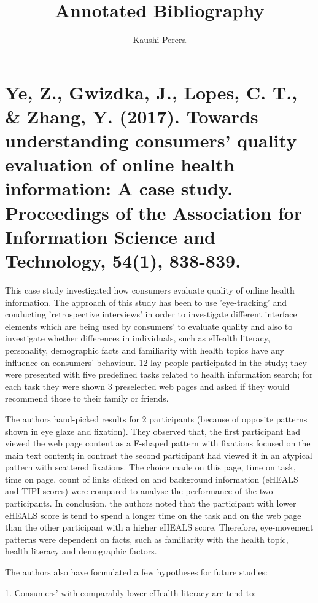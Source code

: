 \documentclass[]{article}
\title{Annotated Bibliography}
\author{Kaushi Perera}
\begin{document}
\maketitle


\section{Ye, Z., Gwizdka, J., Lopes, C. T., \& Zhang, Y. (2017). Towards understanding consumers' quality evaluation of online health information: A case study. Proceedings of the Association for Information Science and Technology, 54(1), 838-839.}

This case study investigated how consumers evaluate quality of online health information. The approach of this study has been to use 'eye-tracking' and conducting 'retrospective interviews' in order to investigate different interface elements which are being used by consumers' to evaluate quality and also to investigate whether differences in individuals, such as eHealth literacy, personality, demographic facts and familiarity with health topics have any influence on consumers' behaviour. 12 lay people participated in the study; they were presented with five predefined tasks related to health information search; for each task they were shown 3 preselected web pages and asked if they would recommend those to their family or friends. 

The authors hand-picked results for 2 participants (because of opposite patterns shown in eye glaze and fixation). They observed that, the first participant had viewed the web page content as a F-shaped pattern with fixations focused on the main text content; in contrast the second participant had viewed it in an atypical pattern with scattered fixations. The choice made on this page, time on task, time on page, count of links clicked on and background information (eHEALS and TIPI scores) were compared to analyse the performance of the two participants. In conclusion, the authors noted that the participant with lower eHEALS score is tend to spend a longer time on the task and on the web page than the other participant with a higher eHEALS score. Therefore, eye-movement patterns were dependent on facts, such as familiarity with the health topic, health literacy and demographic factors.               

The authors also have formulated a few hypotheses for future studies:

1. Consumers’ with comparably lower eHealth literacy are tend to: 
\end{document}
